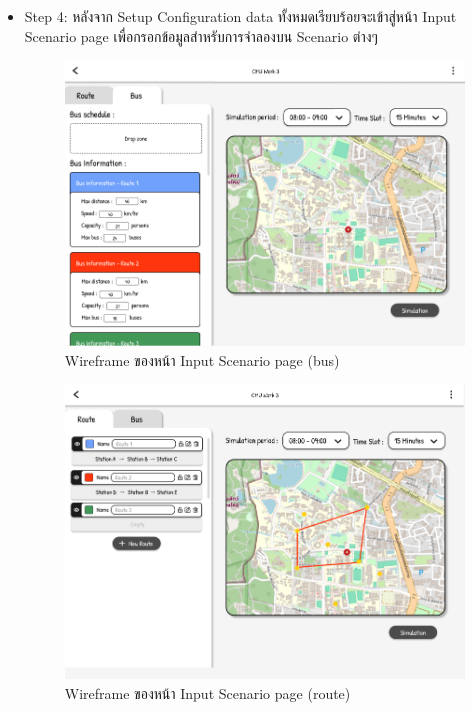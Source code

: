 \begin{mypara}
\begin{itemize}
    \item Step 4: หลังจาก Setup Configuration data ทั้งหมดเรียบร้อยจะเข้าสู่หน้า Input Scenario page เพื่อกรอกข้อมูลสำหรับการจำลองบน Scenario ต่างๆ
      \begin{figure}[H]
        \centering
        \includegraphics[scale=0.4]{input_bus.png}
        \caption{Wireframe ของหน้า Input Scenario page (bus) }
        \label{fig:WireframeInputGuest}
      \end{figure}
      \begin{figure}[H]
        \centering
        \includegraphics[scale=0.4]{input_route.png}
        \caption{Wireframe ของหน้า Input Scenario page (route) }
        \label{fig:WireframeInputRouteGuest}
      \end{figure}


\end{itemize}
\end{mypara}
